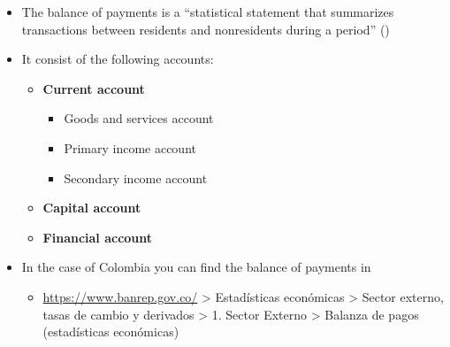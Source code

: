 \documentclass[
  ignorenonframetext,
]{beamer}
\providecommand{\tightlist}{%
  \setlength{\itemsep}{0pt}\setlength{\parskip}{0pt}}\usepackage{longtable,booktabs,array}
\begin{document}
\begin{frame}{}
\label{section-4}
\begin{itemize}
\item
  The balance of payments is a ``statistical statement that summarizes
  transactions between residents and nonresidents during a period''
  ()
\item
  It consist of the following accounts:

  \begin{itemize}
  \item
    \textbf{Current account}

    \begin{itemize}
    \tightlist
    \item
      Goods and services account
    \item
      Primary income account
    \item
      Secondary income account
    \end{itemize}
  \item
    \textbf{Capital account}
  \item
    \textbf{Financial account}
  \end{itemize}
\item
  In the case of Colombia you can find the balance of payments in

  \begin{itemize}
  \tightlist
  \item
    \url{https://www.banrep.gov.co/} \textgreater{} Estadísticas
    económicas \textgreater{} Sector externo, tasas de cambio y
    derivados \textgreater{} 1. Sector Externo \textgreater{} Balanza de
    pagos (estadísticas económicas)
  \end{itemize}
\end{itemize}
\end{frame}
\end{document}
